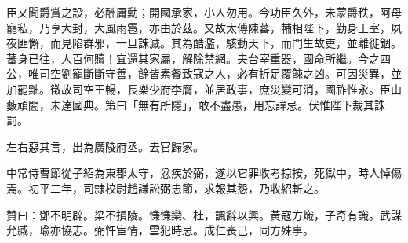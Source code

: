 \begin{pinyinscope}
臣又聞爵賞之設，必酬庸勳；開國承家，小人勿用。今功臣久外，未蒙爵秩，阿母寵私，乃享大封，大風雨雹，亦由於茲。又故太傅陳蕃，輔相陛下，勤身王室，夙夜匪懈，而見陷群邪，一旦誅滅。其為酷濫，駭動天下，而門生故吏，並離徙錮。蕃身已往，人百何贖！宜還其家屬，解除禁網。夫台宰重器，國命所繼。今之四公，唯司空劉寵斷斷守善，餘皆素餐致寇之人，必有折足覆餗之凶。可因災異，並加罷黜。徵故司空王暢，長樂少府李膺，並居政事，庶災變可消，國祚惟永。臣山藪頑闇，未達國典。策曰「無有所隱」，敢不盡愚，用忘諱忌。伏惟陛下裁其誅罰。

左右惡其言，出為廣陵府丞。去官歸家。

中常侍曹節從子紹為東郡太守，忿疾於弼，遂以它罪收考掠按，死獄中，時人悼傷焉。初平二年，司隸校尉趙謙訟弼忠節，求報其怨，乃收紹斬之。

贊曰：鄧不明辟。梁不損陵。慊慊欒、杜，諷辭以興。黃寇方熾，子奇有識。武謀允臧，瑜亦協志。弼忤宦情，雲犯時忌。成仁喪己，同方殊事。


\end{pinyinscope}